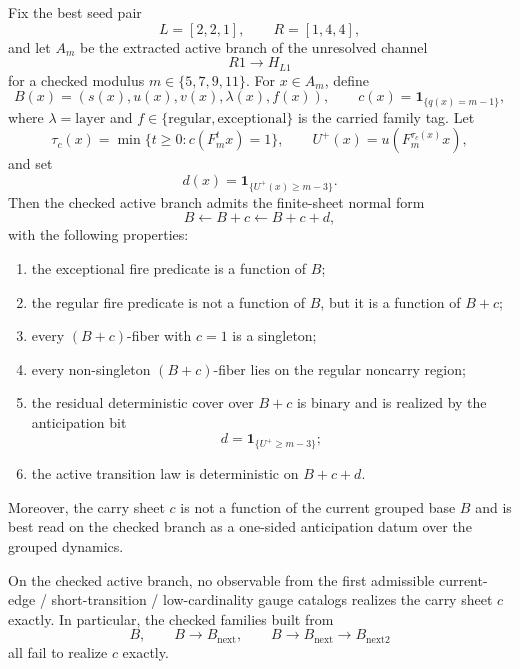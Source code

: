 
\begin{theorem}
Fix the best seed pair
\[
L=[2,2,1],\qquad R=[1,4,4],
\]
and let $A_m$ be the extracted active branch of the unresolved channel
\[
R1 \to H_{L1}
\]
for a checked modulus $m\in\{5,7,9,11\}$. For $x\in A_m$, define
\[
B(x)=(s(x),u(x),v(x),\lambda(x),f(x)),
\qquad
c(x)=\mathbf 1_{\{q(x)=m-1\}},
\]
where $\lambda=\mathrm{layer}$ and $f\in\{\mathrm{regular},\mathrm{exceptional}\}$ is the carried family tag. Let
\[
\tau_c(x)=\min\{t\ge 0 : c(F_m^t x)=1\},
\qquad
U^+(x)=u(F_m^{\tau_c(x)}x),
\]
and set
\[
d(x)=\mathbf 1_{\{U^+(x)\ge m-3\}}.
\]
Then the checked active branch admits the finite-sheet normal form
\[
B \leftarrow B+c \leftarrow B+c+d,
\]
with the following properties:
\begin{enumerate}
\item the exceptional fire predicate is a function of $B$;
\item the regular fire predicate is not a function of $B$, but it is a function of $B+c$;
\item every $(B+c)$-fiber with $c=1$ is a singleton;
\item every non-singleton $(B+c)$-fiber lies on the regular noncarry region;
\item the residual deterministic cover over $B+c$ is binary and is realized by the anticipation bit
\[
d=\mathbf 1_{\{U^+\ge m-3\}};
\]
\item the active transition law is deterministic on $B+c+d$.
\end{enumerate}
Moreover, the carry sheet $c$ is not a function of the current grouped base $B$ and is best read on the checked branch as a one-sided anticipation datum over the grouped dynamics.
\end{theorem}

\begin{proposition}
On the checked active branch, no observable from the first admissible current-edge / short-transition / low-cardinality gauge catalogs realizes the carry sheet $c$ exactly. In particular, the checked families built from
\[
B,
\qquad
B\to B_{\mathrm{next}},
\qquad
B\to B_{\mathrm{next}}\to B_{\mathrm{next2}}
\]
all fail to realize $c$ exactly.
\end{proposition}

